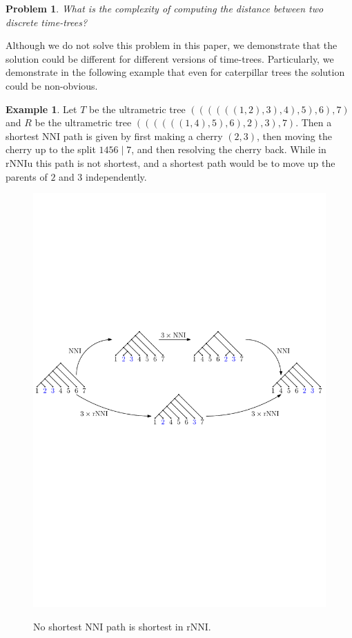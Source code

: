 \documentclass{amsart}
\newtheorem{problem}[lemma]{Problem}
\theoremstyle{definition}
\newtheorem{example}[lemma]{Example}
\newcommand{\nni}{\mathrm{NNI}}
\newcommand{\rnni}{\mathrm{rNNI}}
\newcommand{\rnniu}{\mathrm{rNNIu}}
\begin{document}
\begin{problem}
What is the complexity of computing the distance between two discrete time-trees?
\end{problem}

Although we do not solve this problem in this paper, we demonstrate that the solution could be different for different versions of time-trees.
Particularly, we demonstrate in the following example that even for caterpillar trees the solution could be non-obvious.

\begin{example}
Let $T$ be the ultrametric tree $((((((1, 2), 3), 4), 5), 6), 7)$ and $R$ be the ultrametric tree $((((((1, 4), 5), 6), 2), 3), 7)$.
Then a shortest $\nni$ path is given by first making a cherry $(2,3)$, then moving the cherry up to the split $1456 \mid 7$, and then resolving the cherry back.
While in $\rnniu$ this path is not shortest, and a shortest path would be to move up the parents of $2$ and $3$ independently.

\begin{figure}[ht]
\centering
\includegraphics[width=\textwidth]{NNI_VS_rNNI.pdf}
\label{NNI_VS_rNNI.pdf}
\caption{No shortest $\nni$ path is shortest in $\rnni$.}
\end{figure}
\end{example}
\end{document}
